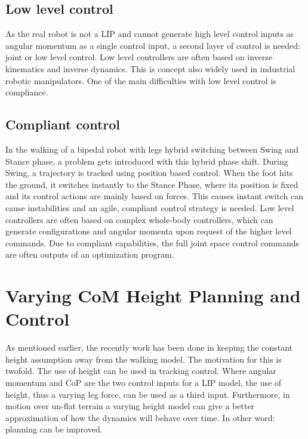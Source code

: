 \subsection{Low level control}
As the real robot is not a \ac{LIP} and cannot generate high level control inputs as angular momentum as a single control input, a second layer of control is needed: joint or low level control. Low level controllers are often based on inverse kinematics and inverse dynamics. This is concept also widely used in industrial robotic manipulators. One of the main difficulties with low level control is compliance.
\subsection{Compliant control}
In the walking of a bipedal robot with legs hybrid switching between Swing and Stance phase, a problem gets introduced with this hybrid phase shift. During Swing, a trajectory is tracked using position based control. When the foot hits the ground, it switches instantly to the Stance Phase, where its position is fixed and its control actions are mainly based on forces. This causes instant switch can cause instabilities and an agile, compliant control strategy is needed. Low level controllers are often based on complex whole-body controllers, which can generate configurations and angular momenta upon request of the higher level commands. Due to compliant capabilities, the full joint space control commands are often outputs of an optimization program.   

\section{Varying CoM Height Planning and Control}
As mentioned earlier, the recently work has been done in keeping the constant height assumption away from the walking model. The motivation for this is twofold. The use of height can be used in tracking control. Where angular momentum and \ac{CoP} are the two control inputs for a \ac{LIP} model, the use of height, thus a varying leg force, can be used as a third input. Furthermore, in motion over un-flat terrain a varying height model can give a better approximation of how the dynamics will behave over time. In other word: planning can be improved. 
